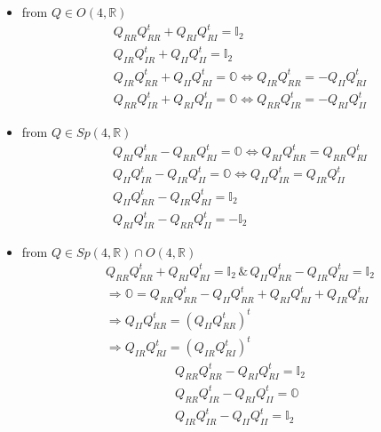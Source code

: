 \documentclass[aps,preprint]{revtex4}%
\begin{document}
\begin{itemize}
\item from $Q\in O\left(  4,\mathbb{R}\right)  $%
\begin{align}
&  Q_{RR}Q_{RR}^{t}+Q_{RI}Q_{RI}^{t}=\mathbb{I}_{2}\\
&  Q_{IR}Q_{IR}^{t}+Q_{II}Q_{II}^{t}=\mathbb{I}_{2}\\
&  Q_{IR}Q_{RR}^{t}+Q_{II}Q_{RI}^{t}=\mathbb{O}\Leftrightarrow Q_{IR}%
Q_{RR}^{t}=-Q_{II}Q_{RI}^{t}\\
&  Q_{RR}Q_{IR}^{t}+Q_{RI}Q_{II}^{t}=\mathbb{O}\Leftrightarrow Q_{RR}%
Q_{IR}^{t}=-Q_{RI}Q_{II}^{t}%
\end{align}


\item from $Q\in Sp\left(  4,\mathbb{R}\right)  $%
\begin{align}
&  Q_{RI}Q_{RR}^{t}-Q_{RR}Q_{RI}^{t}=\mathbb{O}\Leftrightarrow Q_{RI}%
Q_{RR}^{t}=Q_{RR}Q_{RI}^{t}\\
&  Q_{II}Q_{IR}^{t}-Q_{IR}Q_{II}^{t}=\mathbb{O}\Leftrightarrow Q_{II}%
Q_{IR}^{t}=Q_{IR}Q_{II}^{t}\\
&  Q_{II}Q_{RR}^{t}-Q_{IR}Q_{RI}^{t}=\mathbb{I}_{2}\\
&  Q_{RI}Q_{IR}^{t}-Q_{RR}Q_{II}^{t}=-\mathbb{I}_{2}%
\end{align}


\item from $Q\in Sp\left(  4,\mathbb{R}\right)  \cap O\left(  4,\mathbb{R}%
\right)  $
\begin{align}
&  Q_{RR}Q_{RR}^{t}+Q_{RI}Q_{RI}^{t}=\mathbb{I}_{2}\,\&\,Q_{II}Q_{RR}%
^{t}-Q_{IR}Q_{RI}^{t}=\mathbb{I}_{2}\\
&  \Rightarrow\mathbb{O}=Q_{RR}Q_{RR}^{t}-Q_{II}Q_{RR}^{t}+Q_{RI}Q_{RI}%
^{t}+Q_{IR}Q_{RI}^{t}\\
&  \Rightarrow Q_{II}Q_{RR}^{t}=\left(  Q_{II}Q_{RR}^{t}\right)  ^{t}\\
&  \Rightarrow Q_{IR}Q_{RI}^{t}=\left(  Q_{IR}Q_{RI}^{t}\right)  ^{t}%
\end{align}%
\begin{align}
&  Q_{RR}Q_{RR}^{t}-Q_{RI}Q_{RI}^{t}=\mathbb{I}_{2}\\
&  Q_{RR}Q_{IR}^{t}-Q_{RI}Q_{II}^{t}=\mathbb{O}\\
&  Q_{IR}Q_{IR}^{t}-Q_{II}Q_{II}^{t}=\mathbb{I}_{2}%
\end{align}

\end{itemize}
\end{document}
